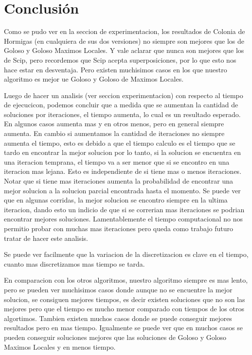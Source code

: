 \newpage
\section{Conclusión}\label{sec:conclusion}

Como se pudo ver en la seccion de experimentacion, los resultados de Colonia de Hormigas (en cualquiera de sus dos versiones) no siempre son mejores que los de Goloso y Goloso Maximos Locales. Y vale aclarar que nunca son mejores que los de Scip, pero recordemos que Scip acepta superposiciones, por lo que esto nos hace estar en desventaja. 
Pero existen muchisimos casos en los que nuestro algoritmo es mejor ue Goloso y Goloso de Maximos Locales.

Luego de hacer un analisis (ver seccion experimentacion) con respecto al tiempo de ejecucicon, podemos concluir que a medida que se aumentan la cantidad de soluciones por iteraciones, el tiempo aumenta, lo cual es un resultado esperado. En algunos casos aumenta mas y en otros menos, pero en general siempre aumenta.
En cambio si aumentamos la cantidad de iteraciones no siempre aumenta el tiempo, esto es debido a que el tiempo calculo es el tiempo que se tardo en encontrar la mejor solucion por lo tanto, si la solucion se encuentra en una iteracion temprana, el tiempo va a ser menor que si se encontro en una iteracion mas lejana. Esto es independiente de si tiene mas o menos iteraciones. Notar que si tiene mas iteraciones aumenta la probabilidad de encontrar una mejor solucion a la solucion parcial encontrada hasta el momento. 
Se puede ver que en algunas corridas, la mejor solucion se encontro siempre en la ultima iteracion, dando esto un indicio de que si se correrian mas iteraciones se podrian encontrar mejores soluciones. Lamentablemente el tiempo computacional no nos permitio probar con muchas mas iteraciones pero queda como trabajo futuro tratar de hacer este analisis.

Se puede ver facilmente que la variacion de la discretizacion es clave en el tiempo, cuanto mas discretizamos mas tiempo se tarda.

En comparacion con los otros algoritmos, nuestro algoritmo siempre es mas lento, pero se pueden ver muchisimos casos donde aunque no se encuentre la mejor solucion, se consiguen mejores tiempos, es decir existen soluciones que no son las mejores pero que el tiempo es mucho menor comparado con tiempos de los otros algortimos. Tambien existen muchos casos donde se puede conseguir mejores resultados pero en mas tiempo. Igualmente se puede ver que en muchos casos se pueden conseguir soluciones mejores que las soluciones de Goloso y Goloso Maximos Locales y en menos tiempo. 

